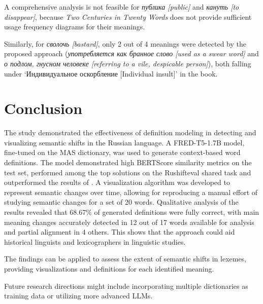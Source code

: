 \documentclass[11pt]{article}
\begin{document}
A comprehensive analysis is not feasible for \textit{публика [public]} and \textit{кануть [to disappear]},
because \textit{Two Centuries in Twenty Words} does not provide sufficient usage frequency diagrams for their meanings.

Similarly, for \textit{сволочь [bastard]}, only 2 out of 4 meanings were detected by the proposed approach (\textit{употребляется как бранное слово [used as a swear word]} and \textit{о подлом, гнусном человеке [referring to a vile, despicable person]}),
both falling under ‘Индивидуальное оскорбление [Individual insult]’ in the book.

\section*{Conclusion}

The study demonstrated the effectiveness of definition modeling in detecting and visualizing semantic shifts in the Russian language.
A FRED-T5-1.7B model, fine-tuned on the MAS dictionary, was used to generate context-based word definitions.
The model demonstrated high BERTScore similarity metrics on the test set,
performed among the top solutions on the Rushifteval shared task and outperformed the results of .
A visualization algorithm was developed to represent semantic changes over time,
allowing for reproducing a manual effort of studying semantic changes for a set of 20 words.
Qualitative analysis of the results revealed that 68.67\% of generated definitions were fully correct,
with main meaning changes accurately detected in 12 out of 17 words available for analysis and partial alignment in 4 others.
This shows that the approach could aid historical linguists and lexicographers in linguistic studies.


The findings can be applied to assess the extent of semantic shifts in lexemes, providing visualizations and definitions for each identified meaning.

Future research directions might include incorporating multiple dictionaries as training data or utilizing more advanced LLMs.
\end{document}
